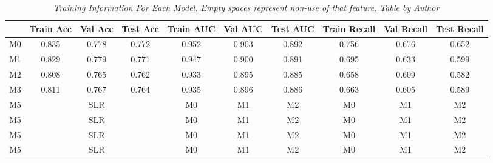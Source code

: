 \begin{landscape}

\begin{table}
\centering
\begin{tabular}{lccccccccc}
    \toprule
 & Train Acc & Val Acc & Test Acc & Train AUC & Val AUC &  Test AUC & Train Recall & Val Recall &  Test Recall \\
 \midrule
M0 & 0.835 & 0.778 & 0.772 & 0.952 & 0.903 & 0.892 & 0.756 & 0.676 & 0.652 \\
M1 & 0.829 & 0.779 & 0.771 & 0.947 & 0.900 & 0.891 & 0.695 & 0.633 & 0.599 \\
M2 & 0.808 & 0.765 & 0.762 & 0.933 & 0.895 & 0.885 & 0.658 & 0.609 & 0.582 \\
M3 & 0.811 & 0.767 & 0.764 & 0.935 & 0.896 & 0.886 & 0.663 & 0.605 & 0.589 \\
\cellcolor{gray!50}M5 & \cellcolor{gray!50} & \cellcolor{gray!50}SLR &  \cellcolor{gray!50} & \cellcolor{gray!50}M0 & \cellcolor{gray!50}M1 & \cellcolor{gray!50}M2 & \cellcolor{gray!50}M0 & \cellcolor{gray!50}M1 & \cellcolor{gray!50}M2  \\
\cellcolor{gray!50}M5 & \cellcolor{gray!50} & \cellcolor{gray!50}SLR &  \cellcolor{gray!50} & \cellcolor{gray!50}M0 & \cellcolor{gray!50}M1 & \cellcolor{gray!50}M2 & \cellcolor{gray!50}M0 & \cellcolor{gray!50}M1 & \cellcolor{gray!50}M2  \\
\cellcolor{gray!50}M5 & \cellcolor{gray!50} & \cellcolor{gray!50}SLR &  \cellcolor{gray!50} & \cellcolor{gray!50}M0 & \cellcolor{gray!50}M1 & \cellcolor{gray!50}M2 & \cellcolor{gray!50}M0 & \cellcolor{gray!50}M1 & \cellcolor{gray!50}M2  \\
\cellcolor{gray!50}M5 & \cellcolor{gray!50} & \cellcolor{gray!50}SLR &  \cellcolor{gray!50} & \cellcolor{gray!50}M0 & \cellcolor{gray!50}M1 & \cellcolor{gray!50}M2 & \cellcolor{gray!50}M0 & \cellcolor{gray!50}M1 & \cellcolor{gray!50}M2  \\
\bottomrule
\end{tabular}
\caption[Training Information For Each Model.]
  {\textit{Training Information For Each Model. Empty spaces represent non-use of that feature.
  Table by Author}}
{\label{table:resume-metrics}}
\end{table}

\end{landscape}
